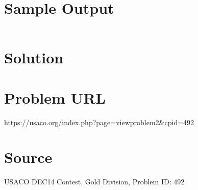 \documentclass[12pt]{article}
\begin{document}
\section*{Sample Output}
\begin{verbatim}

\end{verbatim}

\section*{Solution}


\section*{Problem URL}
https://usaco.org/index.php?page=viewproblem2&cpid=492

\section*{Source}
USACO DEC14 Contest, Gold Division, Problem ID: 492
\end{document}
